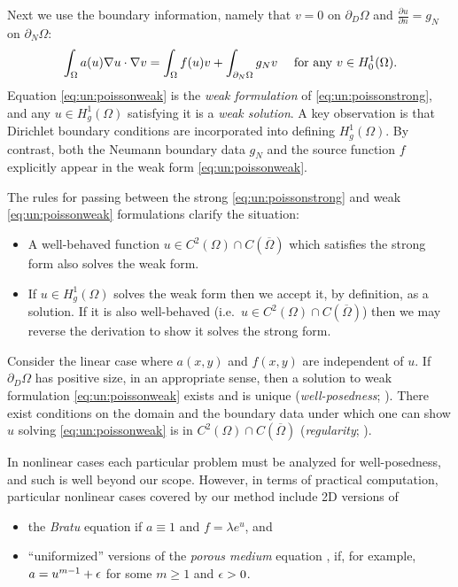 Next we use the boundary information, namely that $v=0$ on $\partial_D\Omega$ and $\frac{\partial u}{\partial n}=g_N$ on $\partial_N\Omega$:
\begin{equation}
\int_\Omega a(u) \nabla u \cdot \nabla v = \int_\Omega f(u) v + \int_{\partial_N\Omega} g_N v\quad \text{ for any } v\in H_{0}^1(\Omega). \label{eq:un:poissonweak}
\end{equation}
Equation \eqref{eq:un:poissonweak} is the \emph{weak formulation} of \eqref{eq:un:poissonstrong}, and any $u \in H_{g}^1(\Omega)$ satisfying it is a \emph{weak solution}.  A key observation is that Dirichlet boundary conditions are incorporated into defining $H_{g}^1(\Omega)$.  By contrast, both the Neumann boundary data $g_N$ and the source function $f$ explicitly appear in the weak form \eqref{eq:un:poissonweak}.

The rules for passing between the strong \eqref{eq:un:poissonstrong} and weak \eqref{eq:un:poissonweak} formulations clarify the situation:\begin{itemize}
\item A well-behaved function $u \in C^2(\Omega) \cap C(\overline \Omega)$ which satisfies the strong form also solves the weak form.
\item If $u \in H_{g}^1(\Omega)$ solves the weak form then we accept it, by definition, as a solution.   If it is also well-behaved (i.e.~$u \in C^2(\Omega) \cap C(\overline \Omega)$) then we may reverse the derivation to show it solves the strong form.
\end{itemize}

Consider the linear case where $a(x,y)$ and $f(x,y)$ are independent of $u$.  If $\partial_D \Omega$ has positive size, in an appropriate sense, then a solution to weak formulation \eqref{eq:un:poissonweak} exists and is unique (\emph{well-posedness}; \citep{Ciarlet2002,Evans2010}).  There exist conditions on the domain and the boundary data under which one can show $u$ solving \eqref{eq:un:poissonweak} is in $C^2(\Omega) \cap C(\overline \Omega)$ (\emph{regularity}; \citep{Evans2010}).

In nonlinear cases each particular problem must be analyzed for well-posedness, and such is well beyond our scope.  However, in terms of practical computation, particular nonlinear cases covered by our method include 2D versions of
\begin{itemize}
\item the \emph{Bratu} equation if $a\equiv 1$ and $f=\lambda e^u$, and
\item ``uniformized'' versions of the \emph{porous medium} equation \citep{Ockendonetal2003}, if, for example, $a=u^{m-1}+\epsilon$ for some $m\ge 1$ and $\epsilon>0$.
\end{itemize}


